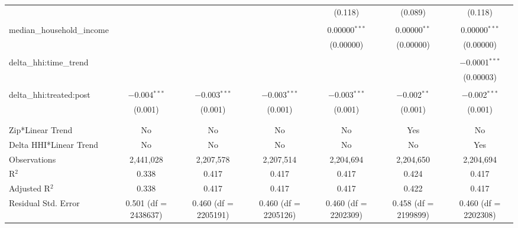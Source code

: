 \begin{table}[H]
{\begin{tabular}{@{\extracolsep{5pt}}lcccccc}
   &  &  &  & (0.118) & (0.089) & (0.118) \\  

   & & & & & & \\  

  median\_household\_income &  &  &  & 0.00000$^{***}$ & 0.00000$^{**}$ & 0.00000$^{***}$ \\  

   &  &  &  & (0.00000) & (0.00000) & (0.00000) \\  

   & & & & & & \\  

  delta\_hhi:time\_trend &  &  &  &  &  & $-$0.0001$^{***}$ \\  

   &  &  &  &  &  & (0.00003) \\  

   & & & & & & \\  

  delta\_hhi:treated:post & $-$0.004$^{***}$ & $-$0.003$^{***}$ & $-$0.003$^{***}$ & $-$0.003$^{***}$ & $-$0.002$^{**}$ & $-$0.002$^{***}$ \\  

   & (0.001) & (0.001) & (0.001) & (0.001) & (0.001) & (0.001) \\  

   & & & & & & \\  

 \hline \\[-1.8ex]  

 Zip*Linear Trend & No & No & No & No & Yes & No \\  

 Delta HHI*Linear Trend & No & No & No & No & No & Yes \\  

 Observations & 2,441,028 & 2,207,578 & 2,207,514 & 2,204,694 & 2,204,650 & 2,204,694 \\  

 R$^{2}$ & 0.338 & 0.417 & 0.417 & 0.417 & 0.424 & 0.417 \\  

 Adjusted R$^{2}$ & 0.338 & 0.417 & 0.417 & 0.417 & 0.422 & 0.417 \\  

 Residual Std. Error & 0.501 (df = 2438637) & 0.460 (df = 2205191) & 0.460 (df = 2205126) & 0.460 (df = 2202309) & 0.458 (df = 2199899) & 0.460 (df = 2202308) \\  

 \hline  


\end{tabular}}
\end{table}
